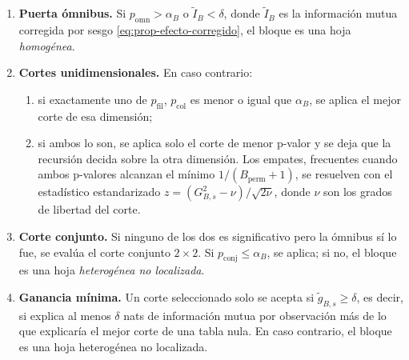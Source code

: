 \begin{enumerate}
  \item \textbf{Puerta ómnibus.} Si $p_{\mathrm{omn}}>\alpha_B$ o
  $\tilde I_B<\delta$, donde $\tilde I_B$ es la información mutua corregida por
  sesgo \eqref{eq:prop-efecto-corregido}, el bloque es una hoja
  \emph{homogénea}.
  \item \textbf{Cortes unidimensionales.} En caso contrario:
  \begin{enumerate}
    \item si exactamente uno de $p_{\mathrm{fil}}$, $p_{\mathrm{col}}$ es
    menor o igual que $\alpha_B$, se aplica el mejor corte de esa dimensión;
    \item si ambos lo son, se aplica solo el corte de menor p-valor y se deja
    que la recursión decida sobre la otra dimensión. Los empates, frecuentes
    cuando ambos p-valores alcanzan el mínimo $1/(B_{\mathrm{perm}}+1)$, se
    resuelven con el estadístico estandarizado
    $z = (G^2_{B,s}-\nu)/\sqrt{2\nu}$, donde $\nu$ son los grados de libertad
    del corte.
  \end{enumerate}
  \item \textbf{Corte conjunto.} Si ninguno de los dos es significativo pero
  la ómnibus sí lo fue, se evalúa el corte conjunto $2\times2$. Si
  $p_{\mathrm{conj}}\le\alpha_B$, se aplica; si no, el bloque es una hoja
  \emph{heterogénea no localizada}.
  \item \textbf{Ganancia mínima.} Un corte seleccionado solo se acepta si
  $\tilde g_{B,s}\ge\delta$, es decir, si explica al menos $\delta$ nats
  de información mutua por observación más de lo que explicaría el mejor corte
  de una tabla nula. En caso contrario, el bloque es una
  hoja heterogénea no localizada.
\end{enumerate}

